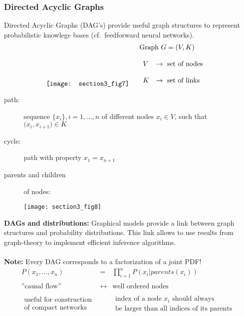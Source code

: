 \subsubsection{Directed Acyclic Graphs}
Directed Acyclic Graphs (DAG's) provide useful graph structures to
represent probabilistic knowlege bases (cf.\ feedforward neural networks).
\begin{equation*}
\begin{array}{ll}
	\raisebox{-10mm}{\texttt{[image: section3\_fig7]}}
	& \begin{array}{l}
		\text{Graph } G = (V, K) \\\\
		\begin{array}{ll}
			V & \rightarrow \text{ set of nodes} \\\\
			K & \rightarrow \text{ set of links}
		\end{array}
	\end{array}
\end{array}
\end{equation*}
\begin{description}
\item[path:]sequence $\big\{ x_i \big\}, i=1, \ldots, n$ of different nodes $x_i \in V$, such that $\big( x_i, x_{i+1} \big) \in K$ 
\item[cycle:] path with property  $x_1 = x_{n+1}$ 
\item[parents and children] of nodes:
\begin{center} \texttt{[image: section3\_fig8]} \end{center}
\end{description}
\textbf{DAGs and distributions:} Graphical models provide a link
between graph structures and probability distributions. This link
allows to use results from graph-theory to implement efficient
inference algorithms.\\\\
\textbf{Note:} Every DAG corresponds to a factorization of a joint PDF!
\begin{equation}
	\begin{array}{ccc}
	P(x_1, \ldots, x_n) & = & \prod\limits_{i=1}^n P(x_i|parents(x_i)) \\\\
	\text{''causal flow''} & \longleftrightarrow 
		& \text{well ordered nodes} \\\\
	\substack{\text{useful for construction} \\ \text{of compact networks}}
	&& \substack{\text{index of a node } x_i \text{ should always} \\
		\text{be larger than all indices of its parents}}
	\end{array}
\end{equation}


